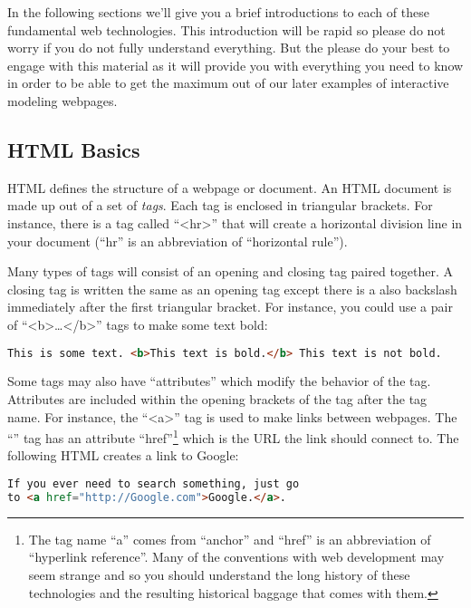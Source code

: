 \documentclass[]{memoir}
\begin{document}
In the following sections we'll give you a brief introductions to each
of these fundamental web technologies. This introduction will be rapid
so please do not worry if you do not fully understand everything. But
the please do your best to engage with this material as it will provide
you with everything you need to know in order to be able to get the
maximum out of our later examples of interactive modeling webpages.

\subsection{HTML Basics}

HTML defines the structure of a webpage or document. An HTML document is
made up out of a set of \emph{tags}. Each tag is enclosed in triangular
brackets. For instance, there is a tag called
``\textless{}hr\textgreater{}'' that will create a horizontal division
line in your document (``hr'' is an abbreviation of ``horizontal
rule'').

Many types of tags will consist of an opening and closing tag paired
together. A closing tag is written the same as an opening tag except
there is a also backslash immediately after the first triangular
bracket. For instance, you could use a pair of
``\textless{}b\textgreater{}\ldots{}\textless{}/b\textgreater{}'' tags
to make some text bold:

\begin{lstlisting}[language=HTML]
This is some text. <b>This text is bold.</b> This text is not bold.
\end{lstlisting}

Some tags may also have ``attributes'' which modify the behavior of the
tag. Attributes are included within the opening brackets of the tag
after the tag name. For instance, the ``\textless{}a\textgreater{}'' tag
is used to make links between webpages. The ``'' tag has an attribute
``href''\footnote{The tag name ``a'' comes from ``anchor'' and ``href''
  is an abbreviation of ``hyperlink reference''. Many of the conventions
  with web development may seem strange and so you should understand the
  long history of these technologies and the resulting historical
  baggage that comes with them.} which is the URL the link should
connect to. The following HTML creates a link to Google:

\begin{lstlisting}[language=HTML]
If you ever need to search something, just go
to <a href="http://Google.com">Google.</a>.
\end{lstlisting}
\end{document}
